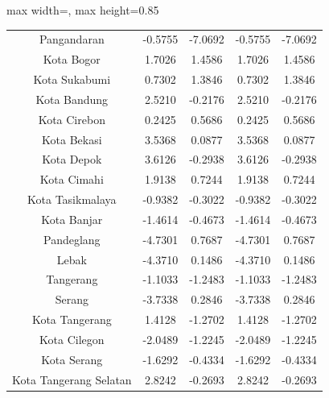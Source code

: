 \begin{table}[H]
\begin{adjustbox}{max width=\textwidth, max height=0.85\textheight}
\begin{tabular}{|c|c|c|c|c|}
Pangandaran & -0.5755 & -7.0692 & -0.5755 & -7.0692 \\
Kota Bogor & 1.7026 & 1.4586 & 1.7026 & 1.4586 \\
Kota Sukabumi & 0.7302 & 1.3846 & 0.7302 & 1.3846 \\
Kota Bandung & 2.5210 & -0.2176 & 2.5210 & -0.2176 \\
Kota Cirebon & 0.2425 & 0.5686 & 0.2425 & 0.5686 \\
Kota Bekasi & 3.5368 & 0.0877 & 3.5368 & 0.0877 \\
Kota Depok & 3.6126 & -0.2938 & 3.6126 & -0.2938 \\
Kota Cimahi & 1.9138 & 0.7244 & 1.9138 & 0.7244 \\
Kota Tasikmalaya & -0.9382 & -0.3022 & -0.9382 & -0.3022 \\
Kota Banjar & -1.4614 & -0.4673 & -1.4614 & -0.4673 \\
Pandeglang & -4.7301 & 0.7687 & -4.7301 & 0.7687 \\
Lebak & -4.3710 & 0.1486 & -4.3710 & 0.1486 \\
Tangerang & -1.1033 & -1.2483 & -1.1033 & -1.2483 \\
Serang & -3.7338 & 0.2846 & -3.7338 & 0.2846 \\
Kota Tangerang & 1.4128 & -1.2702 & 1.4128 & -1.2702 \\
Kota Cilegon & -2.0489 & -1.2245 & -2.0489 & -1.2245 \\
Kota Serang & -1.6292 & -0.4334 & -1.6292 & -0.4334 \\
Kota Tangerang Selatan & 2.8242 & -0.2693 & 2.8242 & -0.2693 \\
\hline
\end{tabular}
\end{adjustbox}
\end{table}